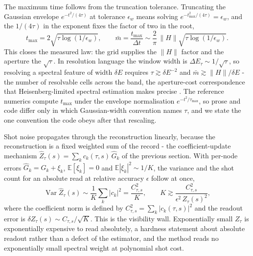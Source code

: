 The maximum time follows from the truncation tolerance. Truncating the Gaussian envelope $e^{-t^2/(4\tau)}$ at tolerance $\epsilon_w$ means solving $e^{-t_{\max}^2/(4\tau)} = \epsilon_w$, and the $1/(4\tau)$ in the exponent fixes the factor of two in the root,
\begin{equation}\label{res:aperture-resolution}
t_{\max} = 2\sqrt{\tau\log(1/\epsilon_w)},
\qquad
\bar m = \frac{t_{\max}}{\Delta t} \sim \frac{2}{\pi}\,\|H\|\sqrt{\tau\log(1/\epsilon_w)} .
\end{equation}
This closes the measured law: the grid supplies the $\|H\|$ factor and the aperture the $\sqrt{\tau}$. In resolution language the window width is $\Delta E_\tau \sim 1/\sqrt{\tau}$, so resolving a spectral feature of width $\delta E$ requires $\tau \gtrsim \delta E^{-2}$ and $\bar m \gtrsim \|H\|/\delta E$ - the number of resolvable cells across the band, the aperture-cost correspondence that Heisenberg-limited spectral estimation makes precise \cite{lin2022heisenberg}. The reference numerics compute $t_{\max}$ under the envelope normalisation $e^{-t^2/\tau_{\max}}$, so prose and code differ only in which Gaussian-width convention names $\tau$, and we state the one convention the code obeys after that rescaling.

Shot noise propagates through the reconstruction linearly, because the reconstruction is a fixed weighted sum of the record - the coefficient-update mechanism $\widehat Z_\tau(s) = \sum_k c_k(\tau,s)\,\widehat G_k$ of the previous section. With per-node errors $\widehat G_k = G_k + \xi_k$, $\mathbb{E}[\xi_k] = 0$ and $\mathbb{E}|\xi_k|^2 \sim 1/K$, the variance and the shot count for an absolute read at relative accuracy $\epsilon$ follow at once,
\begin{equation}\label{res:shot-floor-visibility-wall}
\operatorname{Var}\widehat Z_\tau(s) \sim \frac{1}{K}\sum_k |c_k|^2 = \frac{C_{\tau,s}^2}{K},
\qquad
K \gtrsim \frac{C_{\tau,s}^2}{\epsilon^2\,Z_\tau(s)^2} ,
\end{equation}
where the coefficient norm is defined by $C_{\tau,s}^2 = \sum_k |c_k(\tau,s)|^2$ and the readout error is $\delta Z_\tau(s) \sim C_{\tau,s}/\sqrt{K}$. This is the visibility wall. Exponentially small $Z_\tau$ is exponentially expensive to read absolutely, a hardness statement about absolute readout rather than a defect of the estimator, and the method reads no exponentially small spectral weight at polynomial shot cost.

